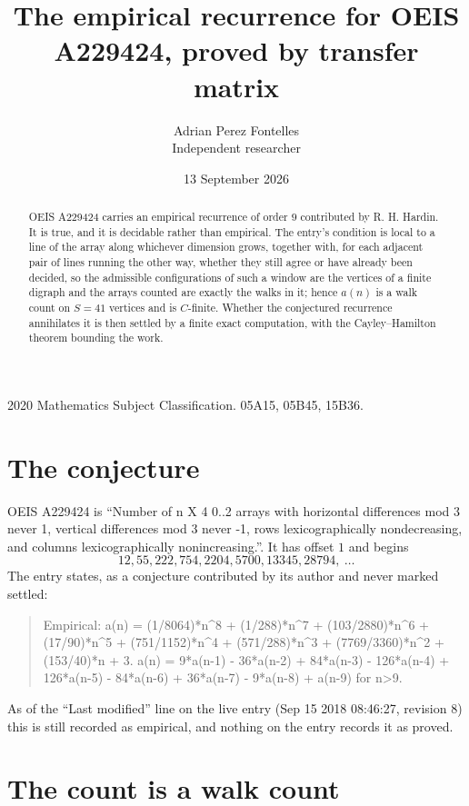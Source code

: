\documentclass[11pt,a4paper]{article}
\title{The empirical recurrence for OEIS A229424, proved by transfer matrix}
\author{Adrian Perez Fontelles\\ \small Independent researcher}
\date{13 September 2026}
\theoremstyle{plain}
\theoremstyle{definition}
\begin{document}
\maketitle

\begin{abstract}
OEIS A229424 carries an empirical recurrence of order $9$ contributed by R. H. Hardin. It is
true, and it is decidable rather than empirical. The entry's condition is local to a line of the array along whichever dimension grows, together with, for each adjacent pair of lines running the other way, whether they still agree or have already been decided, so
the admissible configurations of such a window are the vertices of a finite digraph and the
arrays counted are exactly the walks in it; hence $a(n)$ is a walk count on $S=41$ vertices
and is $C$-finite. Whether the conjectured recurrence annihilates it is then settled by a
finite exact computation, with the Cayley--Hamilton theorem bounding the work.
\end{abstract}

\noindent\small 2020 Mathematics Subject Classification. 05A15, 05B45, 15B36.\normalsize

\section{The conjecture}

OEIS A229424 is ``Number of n X 4 0..2 arrays with horizontal differences mod 3 never 1, vertical differences mod 3 never -1, rows lexicographically nondecreasing, and columns lexicographically nonincreasing.''. It has offset $1$ and begins
\[
12, 55, 222, 754, 2204, 5700, 13345, 28794,\ \dots
\]
The entry states, as a conjecture contributed by its author and never marked settled:
\begin{quote}
Empirical: a(n) = (1/8064)*n\^{}8 + (1/288)*n\^{}7 + (103/2880)*n\^{}6 + (17/90)*n\^{}5 + (751/1152)*n\^{}4 + (571/288)*n\^{}3 + (7769/3360)*n\^{}2 + (153/40)*n + 3. a(n) = 9*a(n-1) - 36*a(n-2) + 84*a(n-3) - 126*a(n-4) + 126*a(n-5) - 84*a(n-6) + 36*a(n-7) - 9*a(n-8) + a(n-9) for n>9.
\end{quote}
As of the ``Last modified'' line on the live entry (Sep 15 2018 08:46:27, revision 8) this is still
recorded as empirical, and nothing on the entry records it as proved.

\section{The count is a walk count}
\end{document}

